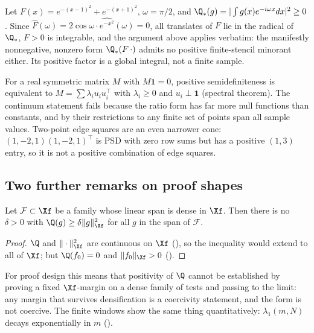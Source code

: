 \begin{example}\label{ex:control}
Let $F(x)=e^{-(x-1)^2}+e^{-(x+1)^2}$, $\omega=\pi/2$, and $\Q_*(g)=|\int g(x)e^{-i\omega x}dx|^2\ge0$. Since
$\widehat F(\omega)=2\cos\omega\cdot\widehat{e^{-x^2}}(\omega)=0$, all translates of $F$ lie in the radical of $\Q_*$, $F>0$ is
integrable, and the argument above applies verbatim: the manifestly nonnegative, nonzero form $\Q_*(F\,\cdot)$ admits no
positive finite-stencil minorant either. Its positive factor is a global integral, not a finite sample.
\end{example}

\begin{remark}
For a real symmetric matrix $M$ with $M\mathbf 1=0$, positive semidefiniteness is equivalent to $M=\sum\lambda_iu_iu_i^{\!\top}$
with $\lambda_i\ge0$ and $u_i\perp\mathbf 1$ (spectral theorem). The continuum statement fails because the ratio form has far
more null functions than constants, and by  their restrictions to any finite set of points span all sample
values. Two-point edge squares are an even narrower cone: $(1,-2,1)(1,-2,1)^{\!\top}$ is PSD with zero row sums but has a
positive $(1,3)$ entry, so it is not a positive combination of edge squares.
\end{remark}

\subsection{Two further remarks on proof shapes}\label{sec:trade}

\begin{proposition}\label{prop:trade}
Let $\mathcal F\subset\Xf$ be a family whose linear span is dense in $\Xf$. Then there is no $\delta>0$ with
$\Q(g)\ge\delta\|g\|_{\Xf}^2$ for all $g$ in the span of $\mathcal F$.
\end{proposition}
\begin{proof}
$\Q$ and $\|\cdot\|_{\Xf}^2$ are continuous on $\Xf$ (), so the inequality would extend to all of $\Xf$; but
$\Q(f_0)=0$ and $\|f_0\|_{\Xf}>0$ ().
\end{proof}
For proof design this means that positivity of $\Q$ cannot be established by proving a fixed $\Xf$-margin on a dense family
of tests and passing to the limit: any margin that survives densification is a coercivity statement, and the form is not coercive. The
finite windows show the same thing quantitatively: $\lambda_1(m,N)$ decays exponentially in $m$ ().

